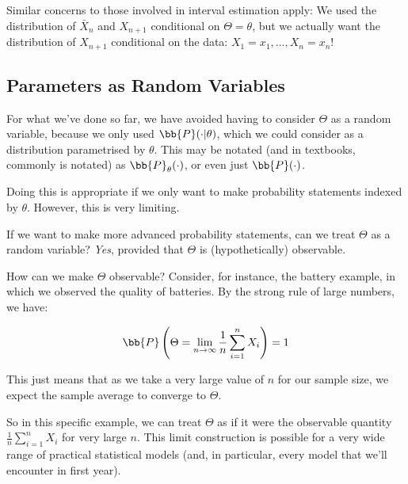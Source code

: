 \documentclass[a4paper]{article}
\begin{document}
                \begin{warn}
                    Similar concerns to those involved in interval estimation
                    apply: We used the distribution of $\bar X_n$ and
                    $X_{n + 1}$ conditional on $\Theta = \theta$, but we
                    actually want the distribution of $X_{n + 1}$ conditional on
                    the data: $X_1 = x_1, ..., X_n = x_n$!
                \end{warn}

        \subsection{Parameters as Random Variables}
            \begin{fread}
                [DS12, section 7.1]
            \end{fread}

            For what we've done so far, we have avoided having to consider
            $\Theta$ as a random variable, because we only used $\bb{P}(\cdot |
            \theta)$, which we could consider as a distribution parametrised by
            $\theta$. This may be notated (and in textbooks, commonly is
            notated) as $\bb{P}_\theta(\cdot)$, or even just $\bb{P}(\cdot)$.

            Doing this is appropriate if we only want to make probability
            statements indexed by $\theta$. However, this is very limiting.

            If we want to make more advanced probability statements, can we
            treat $\Theta$ as a random variable? \textit{Yes}, provided that
            $\Theta$ is (hypothetically) observable.

            How can we make $\Theta$ observable? Consider, for instance, the
            battery example, in which we observed the quality of batteries. By
            the strong rule of large numbers, we have:

            \[
                \bb{P}\left(\Theta = \lim_{n \to \infty} \frac{1}{n}
                \sum_{i=1}^n X_i\right) = 1
            \]

            This just means that as we take a very large value of $n$ for our
            sample size, we expect the sample average to converge to $\Theta$.

            So in this specific example, we can treat $\Theta$ as if it were the
            observable quantity $\frac{1}{n} \sum\limits_{i=1}^n X_i$ for very
            large $n$. This limit construction is possible for a very wide range
            of practical statistical models (and, in particular, every model
            that we'll encounter in first year).
\end{document}

